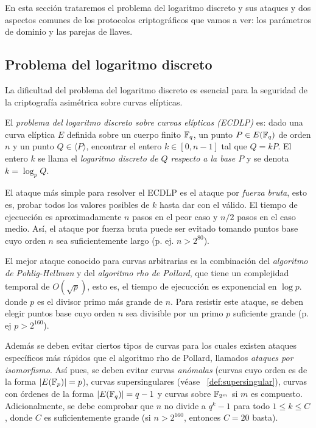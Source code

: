 
En esta sección trataremos el problema del logaritmo discreto y sus ataques y dos aspectos comunes de los protocolos criptográficos que vamos a ver: los parámetros de dominio y las parejas de llaves.

\subsection{Problema del logaritmo discreto}
\label{sub:Problema del logaritmo discreto}

La dificultad del problema del logaritmo discreto es esencial para la seguridad de la criptografía asimétrica sobre curvas elípticas.

\begin{definicion}
    El \emph{problema del logaritmo discreto sobre curvas elípticas (ECDLP)} es: dado una curva elíptica $E$ definida sobre un cuerpo finito $\mathbb{F}_q$, un punto $P \in E(\mathbb{F}_q)$ de orden $n$ y un punto $Q \in \langle P \rangle$, encontrar el entero $k \in [0, n - 1]$ tal que $Q = k P$. El entero $k$ se llama el \emph{logaritmo discreto de $Q$ respecto a la base $P$} y se denota $k = \log_p Q$.
\end{definicion}

El ataque más simple para resolver el ECDLP es el ataque por \emph{fuerza bruta}, esto es, probar todos los valores posibles de $k$ hasta dar con el válido. El tiempo de ejecucción es aproximadamente $n$ pasos en el peor caso y $n / 2$ pasos en el caso medio. Así, el ataque por fuerza bruta puede ser evitado tomando puntos base cuyo orden $n$ sea suficientemente largo (p. ej. $n > 2^{80}$).

El mejor ataque conocido para curvas arbitrarias es la combinación del \emph{algoritmo de Pohlig-Hellman} y del \emph{algoritmo rho de Pollard}, que tiene un complejidad temporal de $O(\sqrt{p})$, esto es, el tiempo de ejecucción es exponencial en $\log{p}$. donde $p$ es el divisor primo más grande de $n$. Para resistir este ataque, se deben elegir puntos base cuyo orden $n$ sea divisible por un primo $p$ suficiente grande (p. ej $p > 2^{160}$).

Además se deben evitar ciertos tipos de curvas para los cuales existen ataques específicos más rápidos que el algoritmo rho de Pollard, llamados \emph{ataques por isomorfismo}. Así pues, se deben evitar curvas \emph{anómalas} (curvas cuyo orden es de la forma $|E(\mathbb{F}_p)| = p$), curvas supersingulares (véase ~\ref{def:supersingular}), curvas con órdenes de la forma $|E(\mathbb{F}_q)| = q - 1$ y curvas sobre $\mathbb{F}_{2^m}$ si $m$ es compuesto. Adicionalmente, se debe comprobar que $n$ no divide a $q^k - 1$ para todo $1 \le k \le C$, donde $C$ es suficientemente grande (si $n > 2^{160}$, entonces $C = 20$ basta).

